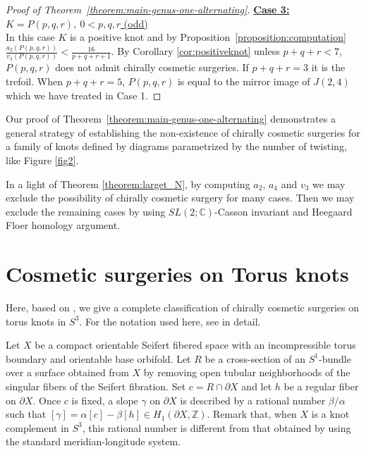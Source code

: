 \documentclass{amsart}
\theoremstyle{remark}
\theoremstyle{definition}
\begin{document}
\begin{proof}[{Proof of Theorem~\ref{theorem:main-genus-one-alternating}}]
\underline{\textbf{Case 3:} $K=P(p,q,r), \ 0<p,q,r$ (odd)}\\

In this case $K$ is a positive knot and by Proposition~\ref{proposition:computation} $\frac{a_2(P(p,q,r))}{v_3(P(p,q,r))}<\frac{16}{p+q+r+1}$. By Corollary \ref{cor:positiveknot} unless $p+q+r < 7$, $P(p,q,r)$ does not admit chirally cosmetic surgeries. If $p+q+r=3$ it is the trefoil.
When $p+q+r=5$, $P(p,q,r)$ is equal to the mirror image of $J(2,4)$ which we have treated in Case 1.
\end{proof}

Our proof of Theorem~\ref{theorem:main-genus-one-alternating} demonstrates a general strategy of establishing the non-existence of chirally cosmetic surgeries for a family of knots defined by diagrams parametrized by the number of twisting, like Figure \ref{fig2}. 

In a light of Theorem \ref{theorem:larget_N}, by computing $a_2$, $a_4$ and $v_3$ we may exclude the possibility of chirally cosmetic surgery for many cases. Then we may exclude the remaining cases by using $SL(2;\mathbb{C})$-Casson invariant and Heegaard Floer homology argument.


\appendix

\section{Cosmetic surgeries on Torus knots}\label{App}

Here, based on \cite{Rong}, we give a complete classification of chirally cosmetic surgeries on torus knots in $S^3$. 
For the notation used here, see \cite{Rong} in detail. 

Let $X$ be a compact orientable Seifert fibered space with an incompressible torus boundary and orientable base orbifold. 
Let $R$ be  a cross-section of an $S^1$-bundle over a surface obtained from $X$ by removing open tubular neighborhoods of the singular fibers of the Seifert fibration. 
Set $c=R\cap \partial X$ and let $h$ be a regular fiber on $\partial X$. 
Once $c$ is fixed, a slope $\gamma$ on $\partial X$ is described by a rational number $\beta/\alpha$ 
such that $[\gamma]=\alpha[c] - \beta[h] \in H_1(\partial X, \mathbb{Z})$. 
Remark that, when $X$ is a knot complement in $S^3$, this rational number is different from that obtained by using the standard meridian-longitude system. 
\end{document}

